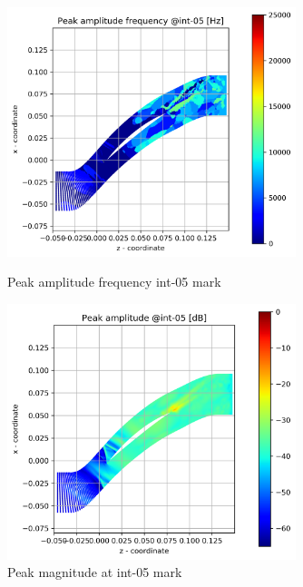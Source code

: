 \begin{figure}[ht]
  \centering
  \includegraphics[width=0.75\textwidth]{Figures/int-05-peak-freq.png}
  \caption{Peak amplitude frequency int-05 mark} \label{int-05-peak-freq}
  
  \vspace*{\floatsep}%

  \includegraphics[width=0.75\textwidth]{Figures/int-05-peak-mag.png}
  \caption{Peak magnitude at int-05 mark} \label{int-05-peak-mag}
\end{figure}

